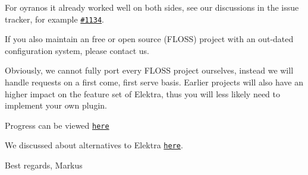 For oyranos it already worked well on both sides, see our discussions in the issue tracker, for example \href{https://issues.libelektra.org/1134}{\tt \#1134}.

If you also maintain an free or open source (F\+L\+O\+SS) project with an out-\/dated configuration system, please contact us.

Obviously, we cannot fully port every F\+L\+O\+SS project ourselves, instead we will handle requests on a first come, first serve basis. Earlier projects will also have an higher impact on the feature set of Elektra, thus you will less likely need to implement your own plugin.


\begin{DoxyItemize}
\item Progress can be viewed \href{https://git.libelektra.org/projects/7}{\tt here}
\item We discussed about alternatives to Elektra \href{https://issues.libelektra.org/1266}{\tt here}.
\end{DoxyItemize}

Best regards, Markus 